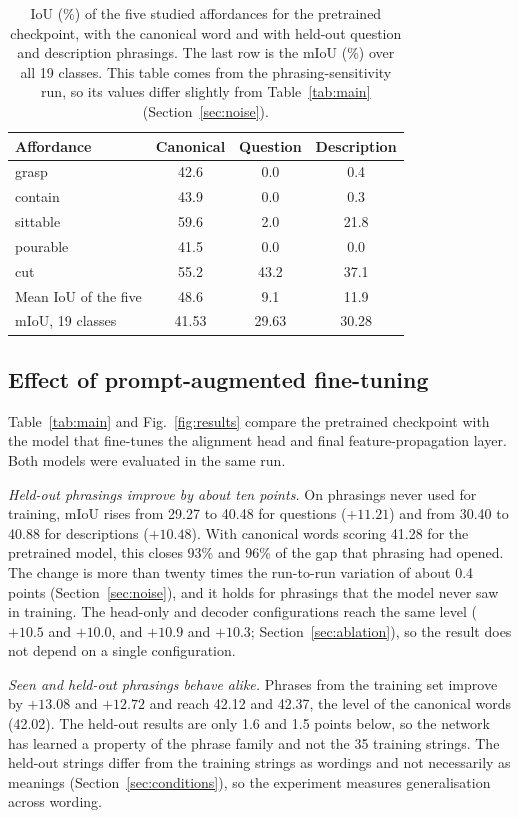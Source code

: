 \documentclass[conference]{IEEEtran}
\begin{document}
\begin{table}[t]
\caption{IoU (\%) of the five studied affordances for the pretrained checkpoint, with the canonical word and with held-out question and description phrasings. The last row is the mIoU (\%) over all 19 classes. This table comes from the phrasing-sensitivity run, so its values differ slightly from Table~\ref{tab:main} (Section~\ref{sec:noise}).}
\label{tab:sens}
\centering
\small
\begin{tabular}{@{}lccc@{}}
\toprule
Affordance & Canonical & Question & Description \\
\midrule
grasp    & 42.6 & 0.0  & 0.4 \\
contain  & 43.9 & 0.0  & 0.3 \\
sittable & 59.6 & 2.0  & 21.8 \\
pourable & 41.5 & 0.0  & 0.0 \\
cut      & 55.2 & 43.2 & 37.1 \\
\midrule
Mean IoU of the five    & 48.6  & 9.1   & 11.9 \\
mIoU, 19 classes        & 41.53 & 29.63 & 30.28 \\
\bottomrule
\end{tabular}
\end{table}

\subsection{Effect of prompt-augmented fine-tuning}
Table~\ref{tab:main} and Fig.~\ref{fig:results} compare the pretrained checkpoint with the model that fine-tunes the alignment head and final feature-propagation layer. Both models were evaluated in the same run.

\emph{Held-out phrasings improve by about ten points.} On phrasings never used for training, mIoU rises from 29.27 to 40.48 for questions ($+11.21$) and from 30.40 to 40.88 for descriptions ($+10.48$). With canonical words scoring 41.28 for the pretrained model, this closes 93\% and 96\% of the gap that phrasing had opened. The change is more than twenty times the run-to-run variation of about 0.4 points (Section~\ref{sec:noise}), and it holds for phrasings that the model never saw in training. The head-only and decoder configurations reach the same level ($+10.5$ and $+10.0$, and $+10.9$ and $+10.3$; Section~\ref{sec:ablation}), so the result does not depend on a single configuration.

\emph{Seen and held-out phrasings behave alike.} Phrases from the training set improve by $+13.08$ and $+12.72$ and reach 42.12 and 42.37, the level of the canonical words (42.02). The held-out results are only 1.6 and 1.5 points below, so the network has learned a property of the phrase family and not the 35 training strings. The held-out strings differ from the training strings as wordings and not necessarily as meanings (Section~\ref{sec:conditions}), so the experiment measures generalisation across wording.
\end{document}
